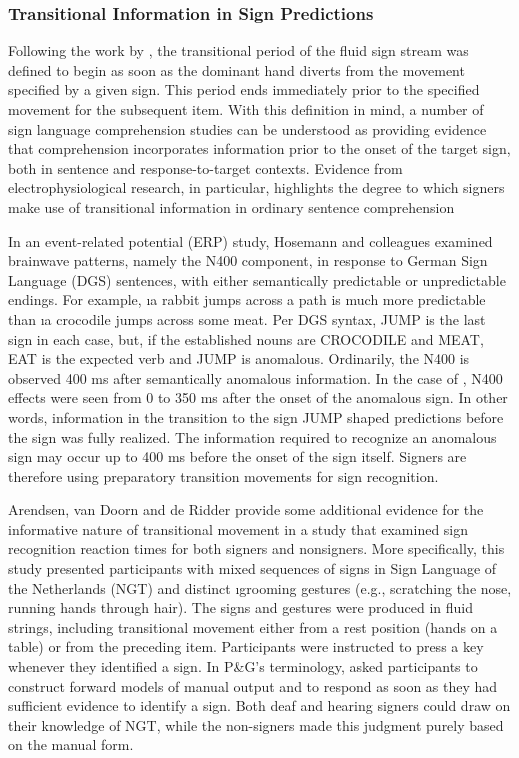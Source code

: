         \subsubsection{Transitional Information in Sign Predictions}
            \label{sec:intro_trans_predict}
            Following the work by , the transitional period of the fluid sign stream was defined to begin as soon as the dominant hand diverts from the movement specified by a given sign. This period ends immediately prior to the specified movement for the subsequent item. With this definition in mind, a number of sign language comprehension studies can be understood as providing evidence that comprehension incorporates information prior to the onset of the target sign, both in sentence and response-to-target contexts. Evidence from electrophysiological research, in particular, highlights the degree to which signers make use of transitional information in ordinary sentence comprehension\par
            In an event-related potential (ERP) study, Hosemann and colleagues \citeyear{hosemann2013} examined brainwave patterns, namely the N400 component, in response to German Sign Language (DGS) sentences, with either semantically predictable or unpredictable endings. For example, \i{a rabbit jumps across a path} is much more predictable than \i{a crocodile jumps across some meat}. Per DGS syntax, JUMP is the last sign in each case, but, if the established nouns are CROCODILE and MEAT, EAT is the expected verb and JUMP is anomalous. 
            Ordinarily, the N400 is observed 400 ms after semantically anomalous information. In the case of , N400 effects were seen from 0 to 350 ms after the onset of the anomalous sign. In other words, information in the transition to the sign JUMP shaped predictions before the sign was fully realized. The information required to recognize an anomalous sign may occur up to 400 ms before the onset of the sign itself. Signers are therefore using preparatory transition movements for sign recognition.\par
            Arendsen, van Doorn and de Ridder \citeyear{arendsen2007} provide some additional evidence for the informative nature of transitional movement in a study that examined sign recognition reaction times for both signers and nonsigners. More specifically, this study presented participants with mixed sequences of signs in Sign Language of the Netherlands (NGT) and distinct \i{grooming gestures} (e.g., scratching the nose, running hands through hair). The signs and gestures were produced in fluid strings, including transitional movement either from a rest position (hands on a table) or from the preceding item. Participants were instructed to press a key whenever they identified a sign. In P\&G's terminology,  asked participants to construct forward models of manual output and to respond as soon as they had sufficient evidence to identify a sign. Both deaf and hearing signers could draw on their knowledge of NGT, while the non-signers made this judgment purely based on the manual form. \par
